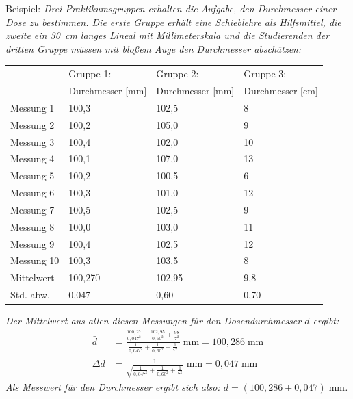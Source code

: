 Beispiel:
\textit{Drei Praktikumsgruppen erhalten die Aufgabe, den Durchmesser einer Dose zu bestimmen. Die erste Gruppe erhält eine Schieblehre als Hilfsmittel, die zweite ein 30~cm langes Lineal mit Millimeterskala und die Studierenden der dritten Gruppe müssen mit bloßem Auge den Durchmesser abschätzen:}

\begin{tabular}{|l|l|l|l|} \hline
		& Gruppe 1: & Gruppe 2: & Gruppe 3:\\
		& Durchmesser [mm] & Durchmesser [mm] & Durchmesser [cm]\\ \hline
	Messung 1 & 100,3 & 102,5 & 8 \\
	Messung 2 & 100,2 & 105,0 & 9\\
	Messung 3 & 100,4 & 102,0 & 10 \\
	Messung 4 & 100,1 & 107,0 & 13 \\
	Messung 5 & 100,2 & 100,5 & 6 \\
	Messung 6 & 100,3 & 101,0 & 12 \\
	Messung 7 & 100,5 & 102,5 & 9\\
	Messung 8 & 100,0 & 103,0 & 11\\
	Messung 9 & 100,4 & 102,5 & 12\\
	Messung 10 & 100,3 & 103,5 & 8 \\ \hline
	Mittelwert & 100,270 & 102,95 & 9,8\\ \hline
	Std. abw. & 0,047 & 0,60 & 0,70\\ \hline
\end{tabular}

\textit{Der Mittelwert aus allen diesen Messungen für den Dosendurchmesser $d$ ergibt:}
\begin{align}
	\bar{d} & = \frac{\frac{100,27}{0,047^2}+\frac{102,95}{0,60^2}+\frac{98}{7^2}}{\frac{1}{0,047^2}+\frac{1}{0,60^2}+\frac{1}{7^2}}\;\mathrm{mm} = 100,286\;\mathrm{mm}\\
	\Delta\bar{d} & = \frac{1}{\sqrt{\frac{1}{0,047^2}+\frac{1}{0,60^2}+\frac{1}{7^2}}}\;\mathrm{mm} = 0,047\;\mathrm{mm}
\end{align}
\textit{Als Messwert für den Durchmesser ergibt sich also: $d = (100,286\pm 0,047)\;\mathrm{mm}$.}


